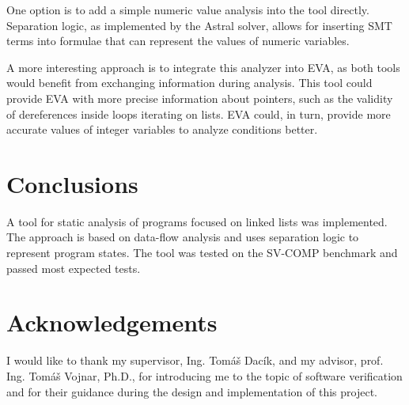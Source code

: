 \documentclass{ExcelAtFIT}
\begin{document}
One option is to add a simple numeric value analysis into the tool directly. Separation logic, as implemented by the Astral solver, allows for inserting SMT terms into formulae that can represent the values of numeric variables.

A more interesting approach is to integrate this analyzer into EVA, as both tools would benefit from exchanging information during analysis. This tool could provide EVA with more precise information about pointers, such as the validity of dereferences inside loops iterating on lists. EVA could, in turn, provide more accurate values of integer variables to analyze conditions better.

\section{Conclusions}

A tool for static analysis of programs focused on linked lists was implemented. The approach is based on data-flow analysis and uses separation logic to represent program states. The tool was tested on the SV-COMP benchmark and passed most expected tests.

\section*{Acknowledgements}

I would like to thank my supervisor, Ing. Tomáš Dacík, and my advisor, prof. Ing. Tomáš Vojnar, Ph.D., for introducing me to the topic of software verification and for their guidance during the design and implementation of this project.



\end{document}
